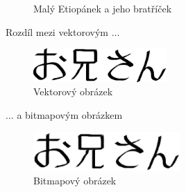 \documentclass[a4paper,11pt]{article}
\begin{document}
\begin{figure}[H]
\begin{subfigure}[b]{0.25\textwidth}
            \centering
        \end{subfigure}
        \caption{Malý Etiopánek a jeho bratříček}
        \label{fig:etiopanecek}
    \end{figure}
    \pagebreak
    Rozdíl mezi vektorovým $\ldots$
        \begin{figure}[H]
            \centering
            \includegraphics[width=0.45\textwidth]{oniisan.eps}
            \caption{Vektorový obrázek}
        \end{figure}
        $\ldots$ a bitmapovým obrázkem    
        \begin{figure}[H]
            \centering
            \includegraphics[width=0.5\textwidth]{oniisan2.eps}
            \caption{Bitmapový obrázek}
            
        \end{figure}
\end{document}
